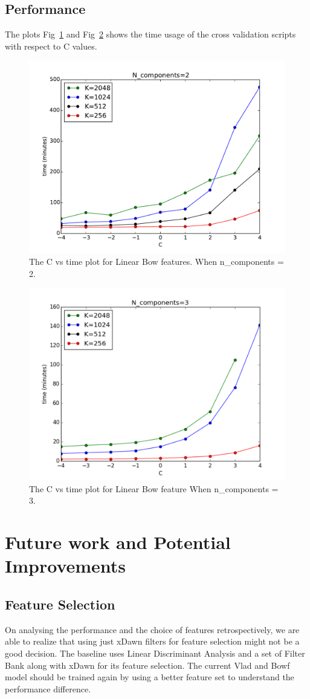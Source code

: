 \documentclass[final,leqno,onefignum,onetabnum]{siamltexmm}
\begin{document}
\subsection{Performance}
The plots Fig~\ref{fig:bowf_time2} and Fig~\ref{fig:bowf_time3} shows the time usage of the cross validation scripts with respect to C values.
\begin{figure}
  \centering
  \includegraphics[width=0.60\linewidth]{images/time2Components}
  \caption{The C vs time plot for Linear Bow features. When n\_components = 2.\label{fig:bowf_time2}}
\end{figure}

\begin{figure}
  \centering
  \includegraphics[width=0.60\linewidth]{images/time3Components}
  \caption{The C vs time plot for Linear Bow feature When n\_components = 3.\label{fig:bowf_time3}}
\end{figure}


\section{Future work and Potential Improvements}
\subsection{Feature Selection}
  On analysing the performance and the choice of features retrospectively, we are able to realize that using just xDawn filters for feature selection might not be a good decision.  
The baseline uses Linear Discriminant Analysis and a set of Filter Bank along with xDawn for its feature selection.
The current Vlad and Bowf model should be trained again by using a better feature set to understand the performance difference.
\end{document}
